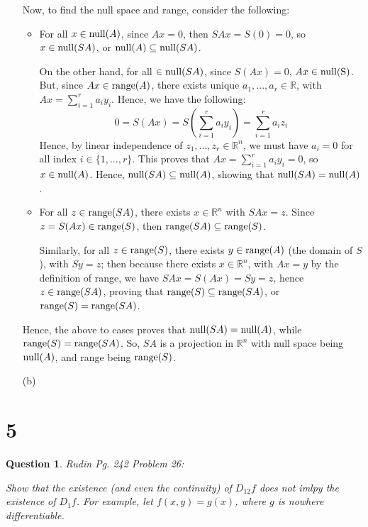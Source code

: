 \documentclass{article}
\newtheorem{question}{Question}
\begin{document}
\begin{itemize}
    \hfil

    Now, to find the null space and range, consider the following:
    \begin{itemize}
        \item For all $x\in\textmd{null}(A)$, since $Ax = 0$, then $SAx = S(0)=0$, so $x\in \textmd{null}(SA)$, or $\textmd{null}(A)\subseteq \textmd{null}(SA)$.
        
        On the other hand, for all $\in \textmd{null}(SA)$, since $S(Ax)=0$, $Ax \in \textmd{null(S)}$. But, since $Ax\in\textmd{range}(A)$, there exists unique $a_1,...,a_r\in\mathbb{R}$, with $Ax = \sum_{i=1}^{r}a_iy_i$. Hence, we have the following:
        $$ 0 = S(Ax)=S\left(\sum_{i=1}^{r}a_iy_i\right) = \sum_{i=1}^{r}a_iz_i$$
        Hence, by linear independence of $z_1,...,z_r\in\mathbb{R}^n$, we must have $a_i=0$ for all index $i\in\{1,...,r\}$.
        This proves that $Ax = \sum_{i=1}^{r}a_iy_i = 0$, so $x\in\textmd{null}(A)$. Hence, $\textmd{null}(SA)\subseteq \textmd{null}(A)$, showing that $\textmd{null}(SA)= \textmd{null}(A)$.

        \item For all $z\in\textmd{range}(SA)$, there exists $x\in\mathbb{R}^n$ with $SAx = z$. Since $z=S(Ax)\in \textmd{range}(S)$, then $\textmd{range}(SA)\subseteq\textmd{range}(S)$.
        
        Similarly, for all $z\in\textmd{range}(S)$, there exists $y\in \textmd{range}(A)$ (the domain of $S$), with $Sy = z$; then because there exists $x\in\mathbb{R}^n$, with $Ax = y$ by the definition of range, we have $SAx = S(Ax) = Sy = z$, hence $z\in \textmd{range}(SA)$, proving that $\textmd{range}(S)\subseteq \textmd{range}(SA)$, or $\textmd{range}(S)=\textmd{range}(SA)$.
    \end{itemize}
    Hence, the above to cases proves that $\textmd{null}(SA)= \textmd{null}(A)$, while $\textmd{range}(S)=\textmd{range}(SA)$. So, $SA$ is a projection in $\mathbb{R}^n$ with null space being $\textmd{null}(A)$, and range being $\textmd{range}(S)$.

    \hfil

    \item[(b)] 
\end{itemize}

\break

\section*{5}
\begin{myBox}[]{}
    \begin{question}
        Rudin Pg. 242 Problem 26:

        Show that the existence (and even the continuity) of $D_{12}f$ does not imlpy the existence of $D_1f$. For example, let $f(x,y)=g(x)$, where $g$ is nowhere differentiable.
    \end{question}
\end{myBox}
\end{document}
